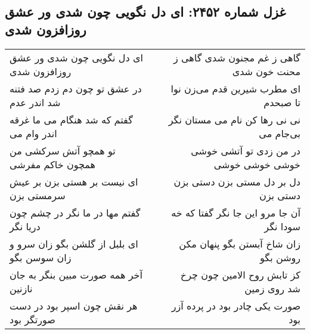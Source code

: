 \begin{center}
\section*{غزل شماره ۲۴۵۲: ای دل نگویی چون شدی ور عشق روزافزون شدی}
\label{sec:2452}
\begin{longtable}{l p{0.5cm} r}
ای دل نگویی چون شدی ور عشق روزافزون شدی
&&
گاهی ز غم مجنون شدی گاهی ز محنت خون شدی
\\
در عشق تو چون دم زدم صد فتنه شد اندر عدم
&&
ای مطرب شیرین قدم می‌زن نوا تا صبحدم
\\
گفتم که شد هنگام می ما غرقه اندر وام می
&&
نی نی رها کن نام می مستان نگر بی‌جام می
\\
تو همچو آتش سرکشی من همچون خاکم مفرشی
&&
در من زدی تو آتشی خوشی خوشی خوشی خوشی
\\
ای نیست بر هستی بزن بر عیش سرمستی بزن
&&
دل بر دل مستی بزن دستی بزن دستی بزن
\\
گفتم مها در ما نگر در چشم چون دریا نگر
&&
آن جا مرو این جا نگر گفتا که خه سودا نگر
\\
ای بلبل از گلشن بگو زان سرو و زان سوسن بگو
&&
زان شاخ آبستن بگو پنهان مکن روشن بگو
\\
آخر همه صورت مبین بنگر به جان نازنین
&&
کز تابش روح الامین چون چرخ شد روی زمین
\\
هر نقش چون اسپر بود در دست صورتگر بود
&&
صورت یکی چادر بود در پرده آزر بود
\\
\end{longtable}
\end{center}
